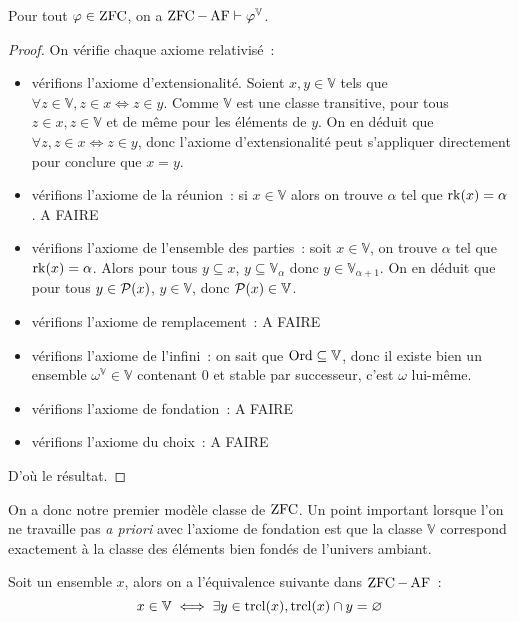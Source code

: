 \begin{theorem}
  Pour tout $\varphi \in \operatorname{ZFC}$, on a $\operatorname{ZFC} - \operatorname{AF} \vdash \varphi^\mathbb V$.
\end{theorem}

\begin{proof}
  On vérifie chaque axiome relativisé~:
  \begin{itemize}
  \item vérifions l'axiome d'extensionalité. Soient $x,y\in \mathbb V$ tels que
    $\forall z\in \mathbb V, z\in x\iff z \in y$. Comme $\mathbb V$ est une
    classe transitive, pour tous $z\in x, z\in \mathbb V$ et de même pour les
    éléments de $y$. On en déduit que $\forall z, z\in x \iff z \in y$, donc
    l'axiome d'extensionalité peut s'appliquer directement pour conclure que
    $x = y$.
  \item vérifions l'axiome de la réunion~: si $x\in \mathbb V$ alors on trouve
    $\alpha$ tel que $\operatorname{rk}(x) = \alpha$. A FAIRE
  \item vérifions l'axiome de l'ensemble des parties~: soit $x\in \mathbb V$,
    on trouve $\alpha$ tel que $\operatorname{rk}(x) = \alpha$. Alors pour tous
    $y\subseteq x$, $y\subseteq \mathbb V_\alpha$ donc
    $y\in\mathbb V_{\alpha +1}$. On en déduit que pour tous $y\in \mathcal{P}(x)$,
    $y\in \mathbb V$, donc $\mathcal{P}(x)\in\mathbb V$.
  \item vérifions l'axiome de remplacement~: A FAIRE
  \item vérifions l'axiome de l'infini~: on sait que $\operatorname{Ord}\subseteq\mathbb V$,
    donc il existe bien un ensemble $\omega^\mathbb V \in \mathbb V$
    contenant $0$ et stable par successeur, c'est $\omega$ lui-même.
  \item vérifions l'axiome de fondation~: A FAIRE
  \item vérifions l'axiome du choix~: A FAIRE
  \end{itemize}
  D'où le résultat.
\end{proof}

On a donc notre premier modèle classe de $\operatorname{ZFC}$. Un point important lorsque l'on
ne travaille pas \emph{a priori} avec l'axiome de fondation est que la classe
$\mathbb V$ correspond exactement à la classe des éléments bien fondés de
l'univers ambiant.

\begin{proposition}
  Soit un ensemble $x$, alors on a l'équivalence suivante dans $\operatorname{ZFC}-\operatorname{AF}$~:
  \[x\in \mathbb V \iff \exists y \in \operatorname{trcl}(x), \operatorname{trcl}(x) \cap y = \varnothing\]
\end{proposition}

